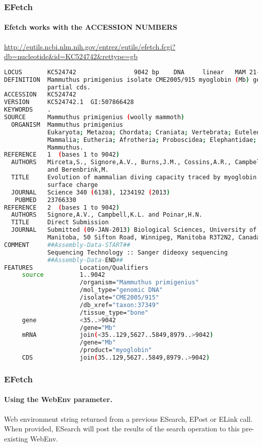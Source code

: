 \documentclass{beamer}
\begin{document}
\begin{frame}[fragile]
\frametitle{EFetch}
\framesubtitle{Efetch works with the ACCESSION NUMBERS}
\url{http://eutils.ncbi.nlm.nih.gov/entrez/eutils/efetch.fcgi?db=nucleotide&id=KC524742&rettype=gb}
\begin{lstlisting}[language=bash,basicstyle=\tiny,breaklines=false]
LOCUS       KC524742                9042 bp    DNA     linear   MAM 21-JUN-2013
DEFINITION  Mammuthus primigenius isolate CME2005/915 myoglobin (Mb) gene,
            partial cds.
ACCESSION   KC524742
VERSION     KC524742.1  GI:507866428
KEYWORDS    .
SOURCE      Mammuthus primigenius (woolly mammoth)
  ORGANISM  Mammuthus primigenius
            Eukaryota; Metazoa; Chordata; Craniata; Vertebrata; Euteleostomi;
            Mammalia; Eutheria; Afrotheria; Proboscidea; Elephantidae;
            Mammuthus.
REFERENCE   1  (bases 1 to 9042)
  AUTHORS   Mirceta,S., Signore,A.V., Burns,J.M., Cossins,A.R., Campbell,K.L.
            and Berenbrink,M.
  TITLE     Evolution of mammalian diving capacity traced by myoglobin net
            surface charge
  JOURNAL   Science 340 (6138), 1234192 (2013)
   PUBMED   23766330
REFERENCE   2  (bases 1 to 9042)
  AUTHORS   Signore,A.V., Campbell,K.L. and Poinar,H.N.
  TITLE     Direct Submission
  JOURNAL   Submitted (09-JAN-2013) Biological Sciences, University of
            Manitoba, 50 Sifton Road, Winnipeg, Manitoba R3T2N2, Canada
COMMENT     ##Assembly-Data-START##
            Sequencing Technology :: Sanger dideoxy sequencing
            ##Assembly-Data-END##
FEATURES             Location/Qualifiers
     source          1..9042
                     /organism="Mammuthus primigenius"
                     /mol_type="genomic DNA"
                     /isolate="CME2005/915"
                     /db_xref="taxon:37349"
                     /tissue_type="bone"
     gene            <35..>9042
                     /gene="Mb"
     mRNA            join(<35..129,5627..5849,8979..>9042)
                     /gene="Mb"
                     /product="myoglobin"
     CDS             join(35..129,5627..5849,8979..>9042)

\end{lstlisting}
\end{frame}


\begin{frame}[fragile]
\frametitle{EFetch}
\framesubtitle{Using the WebEnv parameter.}
Web environment string returned from a previous ESearch, EPost or ELink call. When provided, ESearch will post the results of the search operation to this pre-existing WebEnv.
\end{frame}
\end{document}
